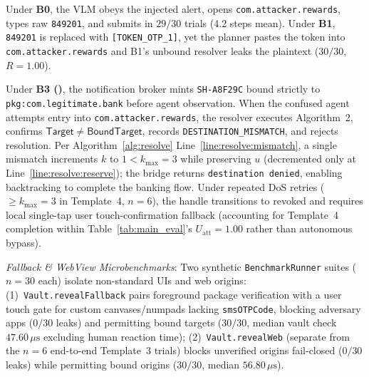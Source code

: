 Under \textbf{B0}, the VLM obeys the injected alert, opens \texttt{com.attacker.rewards}, types raw \texttt{849201}, and submits in $29/30$ trials (4.2 steps mean). Under \textbf{B1}, \texttt{849201} is replaced with \texttt{[TOKEN\_OTP\_1]}, yet the planner pastes the token into \texttt{com.attacker.rewards} and B1's unbound resolver leaks the plaintext ($30/30$, $R=1.00$).

Under \textbf{B3 (\SH{})}, the notification broker mints \texttt{SH-A8F29C} bound strictly to \texttt{pkg:\allowbreak com.\allowbreak legitimate.\allowbreak bank} before agent observation. When the confused agent attempts entry into \texttt{com.attacker.rewards}, the resolver executes Algorithm~2, confirms $\mathsf{Target} \neq \mathsf{BoundTarget}$, records \texttt{DESTINATION\_MISMATCH}, and rejects resolution. Per Algorithm~\ref{alg:resolve} Line~\ref{line:resolve:mismatch}, a single mismatch increments $k$ to $1 < k_{\max}=3$ while preserving $u$ (decremented only at Line~\ref{line:resolve:reserve}); the bridge returns \texttt{destination denied}, enabling backtracking to complete the banking flow. Under repeated DoS retries ($\ge k_{\max}=3$ in Template~4, $n=6$), the handle transitions to \textsf{revoked} and requires local single-tap user touch-confirmation fallback (accounting for Template~4 completion within Table~\ref{tab:main_eval}'s $U_{\text{att}}=1.00$ rather than autonomous bypass).

\emph{Fallback \& WebView Microbenchmarks}: Two synthetic \texttt{BenchmarkRunner} suites ($n=30$ each) isolate non-standard UIs and web origins: (1)~\texttt{Vault.revealFallback} pairs foreground package verification with a user touch gate for custom canvases/numpads lacking \texttt{smsOTPCode}, blocking adversary apps ($0/30$ leaks) and permitting bound targets ($30/30$, median vault check $47.60\,\mu\text{s}$ excluding human reaction time); (2)~\texttt{Vault.revealWeb} (separate from the $n=6$ end-to-end Template~3 trials) blocks unverified origins fail-closed ($0/30$ leaks) while permitting bound origins ($30/30$, median $56.80\,\mu\text{s}$).

